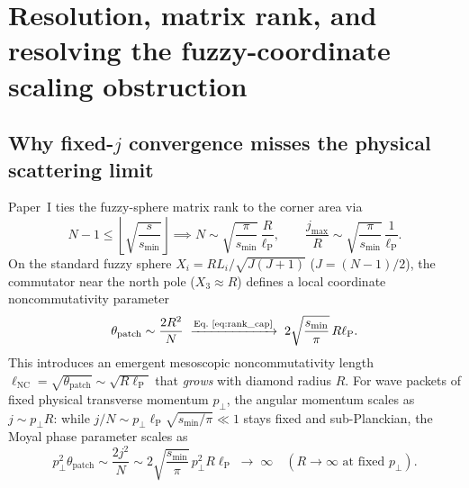 \documentclass[11pt]{article}
\newcommand{\lP}{\ell_{\mathrm{P}}}
\begin{document}
\section{Resolution, matrix rank, and resolving the fuzzy-coordinate scaling obstruction}\label{sec:scaling}

\subsection{Why fixed-\texorpdfstring{$j$}{j} convergence misses the physical scattering limit}

Paper~I ties the fuzzy-sphere matrix rank to the corner area via
\begin{equation}\label{eq:rank_cap}
N - 1 \le \left\lfloor\sqrt{\frac{s}{s_{\min}}}\right\rfloor \implies N \sim \sqrt{\frac{\pi}{s_{\min}}}\,\frac{R}{\lP}, \qquad \frac{j_{\max}}{R} \sim \sqrt{\frac{\pi}{s_{\min}}}\,\frac{1}{\lP}.
\end{equation}
On the standard fuzzy sphere $X_i = R L_i / \sqrt{J(J+1)}$ ($J=(N-1)/2$), the commutator near the north pole ($X_3 \approx R$) defines a local coordinate noncommutativity parameter
\begin{equation}\label{eq:theta_patch}
\theta_{\mathrm{patch}} \sim \frac{2R^2}{N} \;\xrightarrow{\text{Eq.~\eqref{eq:rank_cap}}}\; 2\sqrt{\frac{s_{\min}}{\pi}}\,R\lP.
\end{equation}
This introduces an emergent mesoscopic noncommutativity length $\ell_{\mathrm{NC}} = \sqrt{\theta_{\mathrm{patch}}} \sim \sqrt{R\lP}$ that \emph{grows} with diamond radius $R$. For wave packets of fixed physical transverse momentum $p_\perp$, the angular momentum scales as $j \sim p_\perp R$: while $j/N \sim p_\perp\lP\sqrt{s_{\min}/\pi} \ll 1$ stays fixed and sub-Planckian, the Moyal phase parameter scales as
\begin{equation}\label{eq:moyal_param}
p_\perp^2 \theta_{\mathrm{patch}} \sim \frac{2 j^2}{N} \sim 2\sqrt{\frac{s_{\min}}{\pi}}\,p_\perp^2 R\lP \;\longrightarrow\; \infty \quad (R\to\infty\text{ at fixed }p_\perp).
\end{equation}
\end{document}

